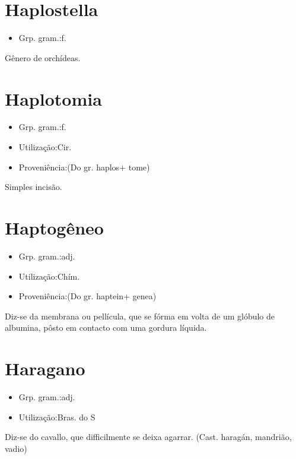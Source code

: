 \documentclass{article}
\begin{document}
\section{Haplostella}
\begin{itemize}
\item {Grp. gram.:f.}
\end{itemize}
Gênero de orchídeas.
\section{Haplotomia}
\begin{itemize}
\item {Grp. gram.:f.}
\end{itemize}
\begin{itemize}
\item {Utilização:Cir.}
\end{itemize}
\begin{itemize}
\item {Proveniência:(Do gr. \textunderscore haplos\textunderscore  + \textunderscore tome\textunderscore )}
\end{itemize}
Simples incisão.
\section{Haptogêneo}
\begin{itemize}
\item {Grp. gram.:adj.}
\end{itemize}
\begin{itemize}
\item {Utilização:Chím.}
\end{itemize}
\begin{itemize}
\item {Proveniência:(Do gr. \textunderscore haptein\textunderscore  + \textunderscore genea\textunderscore )}
\end{itemize}
Diz-se da membrana ou pellícula, que se fórma em volta de um glóbulo de albumina, pôsto em contacto com uma gordura líquida.
\section{Haragano}
\begin{itemize}
\item {Grp. gram.:adj.}
\end{itemize}
\begin{itemize}
\item {Utilização:Bras. do S}
\end{itemize}
Diz-se do cavallo, que difficilmente se deixa agarrar.
(Cast. \textunderscore haragán\textunderscore , mandrião, vadio)
\end{document}

